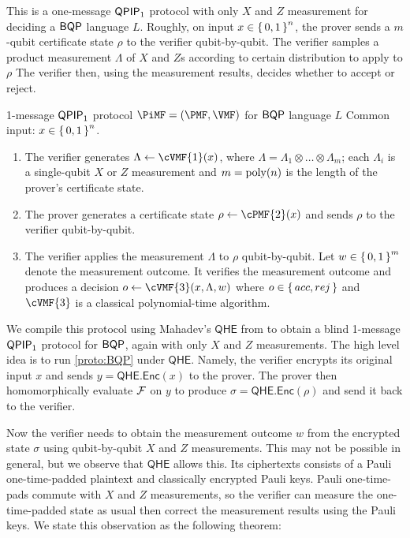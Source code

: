 This is a one-message $\operatorname{\mathsf{QPIP}}_1$ protocol with only $X$ and $Z$ measurement for deciding a $\operatorname{\mathsf{BQP}}$ language $L$.
Roughly, on input $x\in\set{0,1}^n$, the prover sends a $m$-qubit certificate state $\rho$ to the verifier qubit-by-qubit.
The verifier samples a product measurement $\Lambda$ of $X$ and $Z$s according to certain distribution to apply to $\rho$
The verifier then, using the measurement results, decides whether to accept or reject.

\begin{protocol}{1-message $\operatorname{\mathsf{QPIP}}_1$ protocol $\PiMF = (\PMF, \VMF)$ for $\operatorname{\mathsf{BQP}}$ language $L$}
	\label{proto:BQP}
	Common input: $x\in\set{0,1}^n$. 
	\begin{enumerate}
		\item The verifier generates $\Lambda \leftarrow \cVMF{1}(x)$, where $\Lambda=\Lambda_1\otimes\ldots\otimes\Lambda_m$; each $\Lambda_i$ is a single-qubit $X$ or $Z$ measurement and $m=\operatorname*{\operatorname{poly}}(n)$ is the length of the prover's certificate state. 
		\item The prover generates a certificate state $\rho\leftarrow\cPMF{2}(x)$  and sends $\rho$ to the verifier qubit-by-qubit.
		\item The verifier applies the measurement $\Lambda$ to $\rho$ qubit-by-qubit.
			Let $w \in \set{0,1}^m$ denote the measurement outcome.
			It verifies the measurement outcome and produces a decision $o\leftarrow\cVMF{3}(x, \Lambda, w)$ where $o\in\set{acc, rej}$ and $\cVMF{3}$ is a classical polynomial-time algorithm.
	\end{enumerate}
\end{protocol}

We compile this protocol using Mahadev's $\mathsf{QHE}$ from \cite{mahadev_qfhe} to obtain a blind 1-message $\operatorname{\mathsf{QPIP}}_1$ protocol for $\operatorname{\mathsf{BQP}}$, again with only $X$ and $Z$ measurements.
The high level idea is to run \cref{proto:BQP} under $\mathsf{QHE}$.
Namely, the verifier encrypts its original input $x$ and sends $y=\mathsf{QHE.Enc}(x)$ to the prover.
The prover then homomorphically evaluate $\mathcal{F}$ on $y$ to produce $\sigma=\mathsf{QHE.Enc}(\rho)$  and send it back to the verifier.

Now the verifier needs to obtain the measurement outcome $w$ from the encrypted state $\sigma$ using qubit-by-qubit $X$ and $Z$ measurements.
This may not be possible in general, but we observe that $\mathsf{QHE}$ allows this. 
Its ciphertexts consists of a Pauli one-time-padded plaintext and classically encrypted Pauli keys.
Pauli one-time-pads commute with $X$ and $Z$ measurements, so the verifier can measure the one-time-padded state as usual then correct the measurement results using the Pauli keys.
We state this observation as the following theorem:

